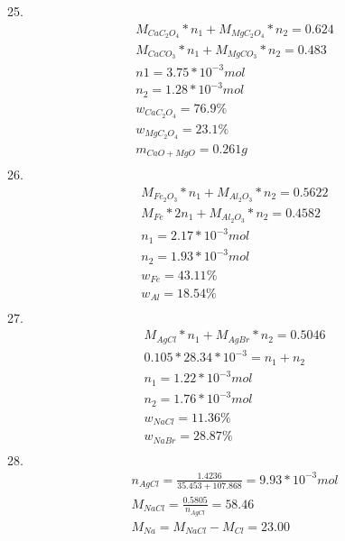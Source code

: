 \documentclass{article}
\begin{document}
25.\begin{equation}
    \begin{multlined}
        M_{CaC_2O_4}*n_1+M_{MgC_2O_4}*n_2 = 0.624\\
        M_{CaCO_3}*n_1+M_{MgCO_3}*n_2 = 0.483\\
        n1 = 3.75*10^{-3} mol\\
        n_2 = 1.28*10^{-3} mol\\
        w_{CaC_2O_4} = 76.9\%\\
        w_{MgC_2O_4} = 23.1\%\\
        m_{CaO+MgO} = 0.261 g\\
    \end{multlined}
\end{equation}
26.\begin{equation}
    \begin{multlined}
        M_{Fe_2O_3}*n_1 + M_{Al_2O_3}*n_2 = 0.5622\\
        M_{Fe}*2n_1 + M_{Al_2O_3}*n_2 = 0.4582\\
        n_1 = 2.17*10^{-3} mol\\
        n_2 = 1.93*10^{-3} mol\\
        w_{Fe} = 43.11\%\\
        w_{Al} = 18.54\%\\
    \end{multlined}
\end{equation}
27.\begin{equation}
    \begin{multlined}
        M_{AgCl}*n_1+M_{AgBr}*n_2 = 0.5046\\
        0.105*28.34*10^{-3} = n_1 +n_2\\
        n_1 = 1.22*10^{-3} mol\\
        n_2 = 1.76*10^{-3} mol\\
        w_{NaCl} = 11.36\%\\
        w_{NaBr} = 28.87\%\\
    \end{multlined}
\end{equation}
28.\begin{equation}
    \begin{multlined}
        n_{AgCl} = \frac{1.4236}{35.453+107.868} = 9.93*10^{-3} mol\\
        M_{NaCl} = \frac{0.5805}{n_{AgCl}} = 58.46\\
        M_{Na} = M_{NaCl} - M_{Cl} = 23.00\\
    \end{multlined}
\end{equation}
\end{document}
